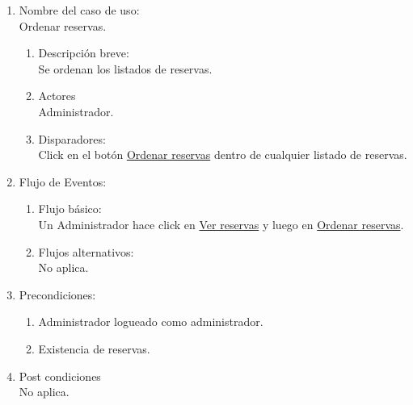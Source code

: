 \documentclass[a4paper,11pt]{article}
\begin{document}
\begin{enumerate}

    \item Nombre del caso de uso: \\
    Ordenar reservas.

    \begin{enumerate}
    \item Descripción breve: \\
        Se ordenan los listados de reservas.
    \item Actores \\
        Administrador.
    \item Disparadores: \\
        Click en el botón \underline{Ordenar reservas}
        dentro de cualquier listado de reservas.
    \end{enumerate}

    \item Flujo de Eventos: \\

    \begin{enumerate}

        \item Flujo básico:\\
            Un Administrador hace click en \underline{Ver reservas} y luego
            en \underline{Ordenar reservas}.
        \item Flujos alternativos:\\
            No aplica.
    \end{enumerate}

    \item Precondiciones: \\
        \begin{enumerate}
            \item Administrador logueado como administrador.
            \item Existencia de reservas.
        \end{enumerate}

    \item Post condiciones \\
        No aplica.

\end{enumerate}

\end{document}
